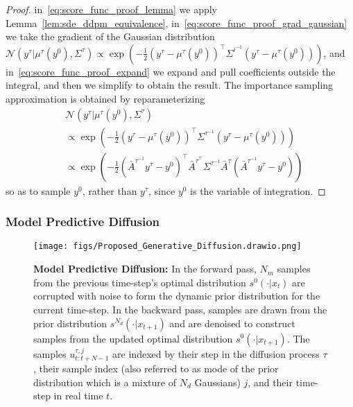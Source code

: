 \documentclass[letterpaper, 10 pt, conference]{IEEEconf}
\begin{document}
\begin{proof}
    in~\eqref{eq:score_func_proof_lemma} we apply Lemma~\ref{lem:sde_ddpm_equivalence},
    in~\eqref{eq:score_func_proof_grad_gaussian} we take the gradient of the Gaussian distribution $\mathcal{N}(y^{\tau} | \mu^{\tau}(y^0), \Sigma^{\tau}) \propto \exp{(-\frac{1}{2} (y^{\tau} - \mu^{\tau}(y^0))^\top \Sigma^{i^{-1}} (y^{\tau} - \mu^{\tau}(y^0)))}$,
    and in~\eqref{eq:score_func_proof_expand} we expand and pull coefficients outside the integral,
    and then we simplify to obtain the result.
    The importance sampling approximation is obtained by reparameterizing 
    \begin{align*}
        & \mathcal{N}(y^{\tau} | \mu^{\tau}(y^0), \Sigma^{\tau}) \\
        &\propto \exp{(-\frac{1}{2} (y^{\tau} - \mu^{\tau}(y^0))^\top \Sigma^{\tau^{-1}} (y^{\tau} - \mu^{\tau}(y^0)))} \\
        & \propto \exp{(-\frac{1}{2} (\bar{A}^{\tau^{-1}}y^{\tau} - y^0)^\top \bar{A}^{\tau^\top} \Sigma^{\tau^{-1}} \bar{A}^{\tau} (\bar{A}^{\tau^{-1}} y^{\tau} - y^0))}
    \end{align*} 
    so as to sample $y^{0}$, rather than $y^{\tau}$, since $y^{0}$ is the variable of integration.
\end{proof}

\subsubsection{Model Predictive Diffusion}

\begin{figure*}[th]
    \centering
    \texttt{[image: figs/Proposed\_Generative\_Diffusion.drawio.png]}
    \caption{\textbf{Model Predictive Diffusion:} In the forward pass, $N_m$ samples from the previous time-step's optimal distribution $s^{0}(\cdot | x_{t})$ are corrupted with noise to form the dynamic prior distribution for the current time-step. In the backward pass, samples are drawn from the prior distribution $s^{N_d}(\cdot | x_{t+1})$ and are denoised to construct samples from  the updated optimal distribution $s^{0}(\cdot | x_{t+1})$. The samples $u_{t:t+N-1}^{\tau, j}$ are indexed by their step in the diffusion process $\tau$, their sample index (also referred to as mode of the prior distribution which is a mixture of $N_d$ Gaussians) $j$, and their time-step in real time $t$.}
    \label{fig:generative_diffusion}
\end{figure*}
\end{document}
